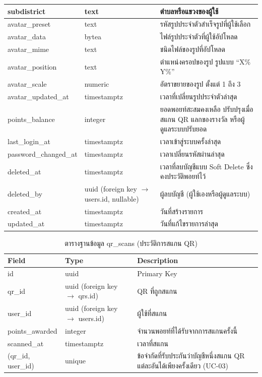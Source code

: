 \begin{longtable}{|p{3.6cm}|p{2.6cm}|p{6.8cm}|}
subdistrict & text & ตำบลหรือแขวงของผู้ใช้ \\ \hline
avatar\_preset & text & รหัสรูปประจำตัวสำเร็จรูปที่ผู้ใช้เลือก \\ \hline
avatar\_data & bytea & ไฟล์รูปประจำตัวที่ผู้ใช้อัปโหลด \\ \hline
avatar\_mime & text & ชนิดไฟล์ของรูปที่อัปโหลด \\ \hline
avatar\_position & text & ตำแหน่งครอปของรูป รูปแบบ ``X\% Y\%'' \\ \hline
avatar\_scale & numeric & อัตราขยายของรูป ตั้งแต่ 1 ถึง 3 \\ \hline
avatar\_updated\_at & timestamptz & เวลาที่เปลี่ยนรูปประจำตัวล่าสุด \\ \hline
points\_balance & integer & ยอดพอยท์สะสมคงเหลือ ปรับปรุงเมื่อสแกน QR แลกของรางวัล หรือผู้ดูแลระบบปรับยอด \\ \hline
last\_login\_at & timestamptz & เวลาเข้าสู่ระบบครั้งล่าสุด \\ \hline
password\_changed\_at & timestamptz & เวลาเปลี่ยนรหัสผ่านล่าสุด \\ \hline
deleted\_at & timestamptz & เวลาที่ลบบัญชีแบบ Soft Delete ซึ่งคงประวัติพอยท์ไว้ \\ \hline
deleted\_by & uuid (foreign key $\to$ users.id, nullable) & ผู้ลบบัญชี (ผู้ใช้เองหรือผู้ดูแลระบบ) \\ \hline
created\_at & timestamptz & วันที่สร้างรายการ \\ \hline
updated\_at & timestamptz & วันที่แก้ไขรายการล่าสุด \\
\hline
\end{longtable}


\begin{table}[H]
\centering
\caption{ตารางฐานข้อมูล qr\_scans (ประวัติการสแกน QR)}
\label{tab:db_qrscans}
\begin{tabular}{|p{3.6cm}|p{2.6cm}|p{6.8cm}|}
\hline
\textbf{Field} & \textbf{Type} & \textbf{Description} \\
\hline
id & uuid & Primary Key \\ \hline
qr\_id & uuid (foreign key $\to$ qrs.id) & QR ที่ถูกสแกน \\ \hline
user\_id & uuid (foreign key $\to$ users.id) & ผู้ใช้ที่สแกน \\ \hline
points\_awarded & integer & จำนวนพอยท์ที่ได้รับจากการสแกนครั้งนี้ \\ \hline
scanned\_at & timestamptz & เวลาที่สแกน \\ \hline
(qr\_id, user\_id) & unique & ข้อจำกัดที่รับประกันว่าบัญชีหนึ่งสแกน QR แต่ละอันได้เพียงครั้งเดียว (UC-03) \\
\hline
\end{tabular}
\end{table}

